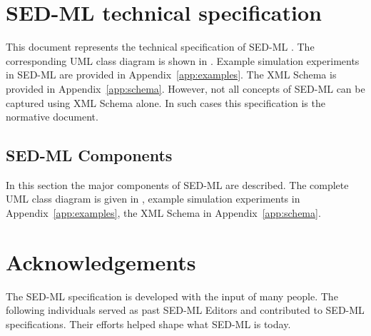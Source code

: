 \documentclass[pdftex,rgb,dvipsnames,svgnames,hyperref,table]{report}
\begin{document}

\tableofcontents
\newpage


\chapter{SED-ML technical specification}
\label{chp:specification}
This document represents the technical specification of SED-ML \currentLV. The corresponding UML class diagram is shown in . Example simulation experiments in SED-ML are provided in Appendix~\ref{app:examples}. The XML Schema is provided in Appendix~\ref{app:schema}. However, not all concepts of SED-ML can be captured using XML Schema alone. In such cases this specification is the normative document. 





\pagebreak
\section{SED-ML Components}
\label{sec:components}
In this section the major components of SED-ML are described. The complete UML class diagram is given in , example simulation experiments in Appendix~\ref{app:examples}, the XML Schema in Appendix~\ref{app:schema}.











\chapter{Acknowledgements}
\label{chp:acknowledgments}
The SED-ML specification is developed with the input of many people. The following individuals served as past SED-ML Editors and contributed to SED-ML specifications. Their efforts helped shape what SED-ML is today.
\end{document}
